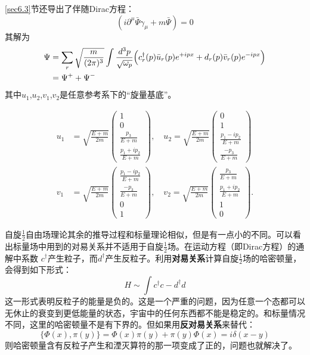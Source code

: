 \ref{sec6.3}节还导出了伴随Dirac方程：
$$(i\partial^{\mu}\bar{\Psi} \gamma_{\mu}+m\bar{\Psi})=0$$
其解为
\begin{align} 
	\Psi &= \sum_{r} \sqrt{\frac{m}{(2\pi)^{3}}}\int \frac{d^{3}p}{\sqrt{\omega_{p}} } \Big( c^{\dagger}_{r}(p) \bar{u}_{r}(p)e^{+ipx}+d_{r}(p) \bar{v}_{r}(p) e^{-ipx} \Big) \label{equ9.35}  \\
	&= \Psi^{+} + \Psi^{-} \notag  
\end{align}
其中$u_{1}$,$u_{2}$,$v_{1}$,$v_{2}$是任意参考系下的“旋量基底”。

\begin{align}
    u_1 &= \sqrt{ \frac{E + m}{2m} }
        \begin{pmatrix}
            1 \\ 0 \\ \frac{p_3}{E + m} \\ \frac{p_1 + i p_2}{E + m}
        \end{pmatrix}, \quad
    u_2 = \sqrt{ \frac{E + m}{2m} }
        \begin{pmatrix}
            0 \\ 1 \\ \frac{p_1 - ip_2}{E + m} \\ \frac{-p_3}{E + m}
        \end{pmatrix}  \label{equ9.36} \\
    v_1 &= \sqrt{ \frac{E + m}{2m} }
        \begin{pmatrix}
            \frac{p_1 - ip_2}{E + m} \\ \frac{-p_3}{E + m} \\ 0 \\ 1
        \end{pmatrix}, \quad
    v_2 = \sqrt{ \frac{E + m}{2m} }
        \begin{pmatrix}
            \frac{p_3}{E + m} \\ \frac{p_1 + ip_2}{E + m} \\ 1 \\ 0
        \end{pmatrix}. \label{equ9.37}
\end{align}

自旋$\frac{1}{2}$自由场理论其余的推导过程和标量理论相似，但是有一点小的不同。可以看出标量场中用到的对易关系并不适用于自旋$\frac{1}{2}$场。在运动方程（即Dirac方程）的通解中系数 $c^{\dagger}$产生粒子，而$d^{\dagger}$产生反粒子。利用{\bfseries 对易关系}计算自旋$\frac{1}{2}$场的哈密顿量，会得到如下形式：
$$H\sim \int c^{\dagger}c-d^{\dagger}d$$
这一形式表明反粒子的能量是负的。这是一个严重的问题，因为任意一个态都可以无休止的衰变到更低能量的状态，宇宙中的任何东西都不能是稳定的。和标量情况不同，这里的哈密顿量不是有下界的。但如果用{\bfseries 反对易关系}来替代：
$$\{ \Phi(x), \pi(y) \}=\Phi(x)\pi(y)+\pi(y)\Phi(x)=i\delta(x-y)$$
则哈密顿量含有反粒子产生和湮灭算符的那一项变成了正的，问题也就解决了。

